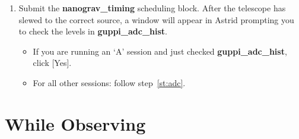 \documentclass[11pt, reqno, tbtags]{article}
\begin{document}
\begin{enumerate}
 \item Submit the \textbf{nanograv\_timing} scheduling block. After the telescope has slewed to the correct source, a window will appear in Astrid prompting you to check the levels in \textbf{guppi\_adc\_hist}.  \begin{itemize}
  \item If you are running an `A' session and just checked \textbf{guppi\_adc\_hist}, click [Yes].  
  \item For all other sessions: follow step~\ref{st:adc}.
 \end{itemize}
\end{enumerate}



\section{While Observing}  %

\end{document}
